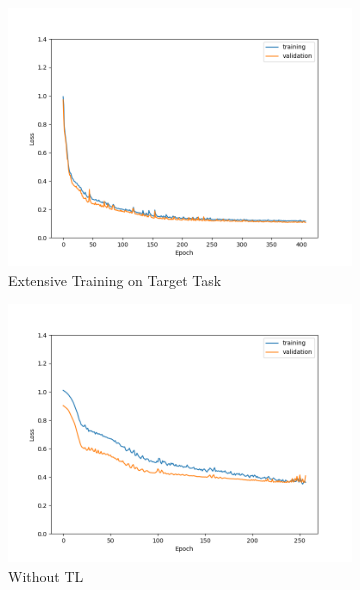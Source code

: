 \begin{figure}[ht!]
    \centering
    \begin{subfigure}{0.48\textwidth}
        \includegraphics[width=\textwidth]{./project3/figures/figure4a.png}
        \caption{Extensive Training on Target Task} 
        \label{subfig3-4:extensive}
    \end{subfigure}\hfill
    \begin{subfigure}{0.48\textwidth}
        \includegraphics[width=\textwidth]{./project3/figures/figure4b.png}
        \caption{Without TL}
        \label{subfig3-4:without}
    \end{subfigure}
    \begin{subfigure}{0.48\textwidth}

\end{subfigure}
\end{figure}
